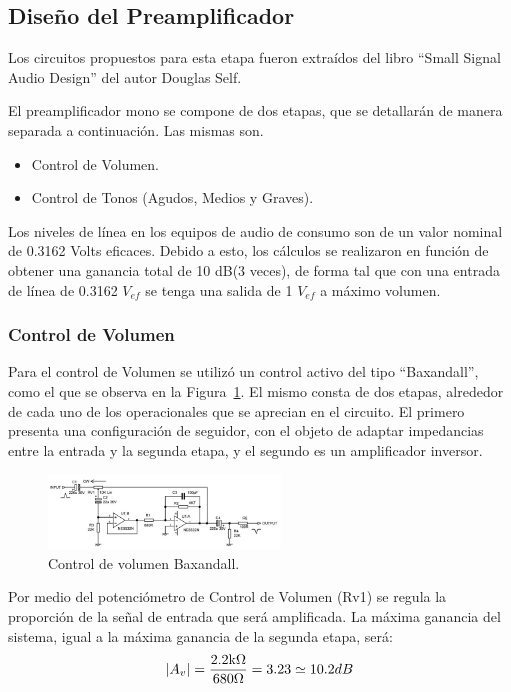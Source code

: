 \subsection{Diseño del Preamplificador}
\medskip
Los circuitos propuestos para esta etapa fueron extraídos del libro “Small Signal Audio Design” del autor Douglas Self.

El preamplificador mono se compone de dos etapas, que se detallarán de manera separada a continuación. Las mismas son.

\begin{itemize}
\item Control de Volumen.
\item Control de Tonos (Agudos, Medios y Graves).
\end{itemize}

Los niveles de línea en los equipos de audio de consumo son de un valor nominal de 0.3162 Volts eficaces. Debido a esto, los cálculos se realizaron en función de obtener una ganancia total de 10 dB(3 veces), de forma tal que con una entrada de línea de 0.3162 $V_{ef}$ se tenga una salida de 1 $V_{ef}$ a máximo volumen.
\medskip
\subsubsection{Control de Volumen}
\medskip
Para el control de Volumen se utilizó un control activo del tipo “Baxandall”, como el que se observa en la Figura~\ref{ctrl_vol}. El mismo consta de dos etapas, alrededor de cada uno de los operacionales que se aprecian en el circuito. El primero presenta una configuración de seguidor, con el objeto de adaptar impedancias entre la entrada y la segunda etapa, y el segundo es un amplificador inversor.


\begin{figure}[H]
\centering
\includegraphics[width=0.55\textwidth]{img/ctrl_vol.png}
\caption{Control de volumen Baxandall.}
\label{ctrl_vol} 
\end{figure}


Por medio del potenciómetro de Control de Volumen (Rv1) se regula la proporción de la señal de entrada que será amplificada.
La máxima ganancia del sistema, igual a la máxima ganancia de la segunda etapa, será: 
$$
\vert A_v \vert = \frac{2.2 \mbox{k}\Omega}{680 \Omega}=3.23\simeq10.2dB
$$

